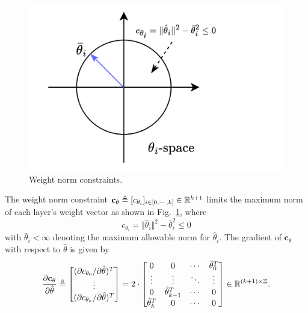 \begin{figure}[t]
    \centering
    \includegraphics[width=0.5\linewidth]{imgs/cstr_weight.drawio.png}
    \caption{Weight norm constraints.}
    \label{chap4:fig:cstr:weight}
\end{figure}

The weight norm constraint $\mathbf{c}_{\theta}\triangleq [c_{\theta_i}]_{i\in[0,\cdots ,k]}\in\mathbb{R}^{k+1}$ limits the maximum norm of each layer's weight vector as shown in Fig.~\ref{chap4:fig:cstr:weight}, where
\begin{equation}
    c_{\theta_i}=\Vert \hat\theta_i\Vert^2 -\bar\theta_i^2 \le 0
    \label{chap4:eq:cstr:weight}
\end{equation}
with $\bar\theta_i<\infty$ denoting the maximum allowable norm for $\hat\theta_i$. 
The gradient of $\mathbf{c}_\theta$ with respect to $\hat\theta$ is given by
\begin{equation}
    {\partial \mathbf c_\theta \over \partial \hat\theta}
    \triangleq
    \begin{bmatrix}
        (\partial c_{\theta_0}/\partial \hat\theta)^T
        \\ 
        \vdots 
        \\
        (\partial c_{\theta_k}/\partial \hat\theta)^T
    \end{bmatrix}
    = 2\cdot 
    \begin{bmatrix}
        0&0&\cdots & \hat\theta_0^T\\
        \vdots&\vdots&\ddots&\vdots\\
        0&\hat\theta^T_{k-1}&\cdots &0\\
        \hat\theta^T_k&0&\cdots &0
    \end{bmatrix}
    \in\mathbb{R}^{(k+1)\times\Xi}
    .
    \label{chap4:eq:cstr:weight_grad}
\end{equation}

